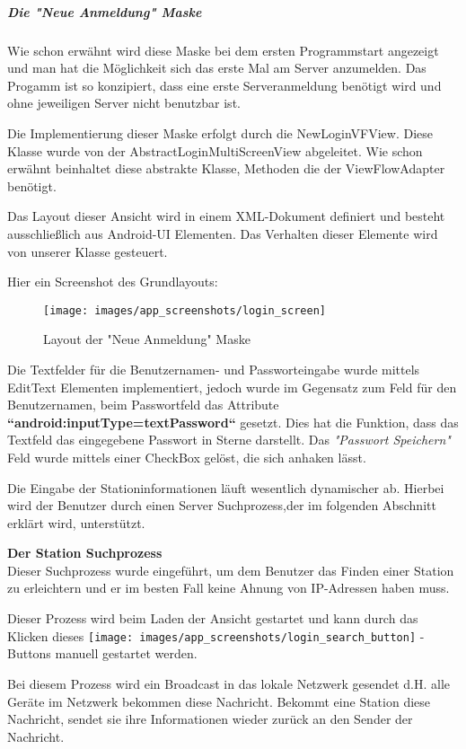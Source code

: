 \subparagraph{Die "Neue Anmeldung" Maske}
Wie schon erwähnt wird diese Maske bei dem ersten Programmstart angezeigt und man hat die Möglichkeit sich das erste Mal am Server anzumelden. Das Progamm ist so konzipiert, dass eine erste Serveranmeldung benötigt wird und ohne jeweiligen Server nicht benutzbar ist.

Die Implementierung dieser Maske erfolgt durch die NewLoginVFView. Diese Klasse wurde von der AbstractLoginMultiScreenView abgeleitet. Wie schon erwähnt beinhaltet diese abstrakte Klasse, Methoden die der ViewFlowAdapter benötigt. 

Das Layout dieser Ansicht wird in einem XML-Dokument definiert und besteht ausschließlich aus Android-UI Elementen. Das Verhalten dieser Elemente wird von unserer Klasse gesteuert.

Hier ein Screenshot des Grundlayouts:

\begin{figure}[H]
\centering
\texttt{[image: images/app\_screenshots/login\_screen]}
\caption{Layout der "Neue Anmeldung" Maske}
\end{figure}



Die Textfelder für die Benutzernamen- und Passworteingabe  wurde mittels EditText Elementen implementiert, jedoch wurde im Gegensatz zum Feld für den Benutzernamen,  beim Passwortfeld das Attribute \textbf{“android:inputType=textPassword“} gesetzt. Dies hat die Funktion, dass das Textfeld das eingegebene Passwort in Sterne darstellt. Das \textit{"Passwort Speichern"} Feld wurde mittels einer CheckBox gelöst, die sich anhaken lässt.

Die Eingabe der Stationinformationen läuft wesentlich dynamischer ab. Hierbei wird der Benutzer durch einen Server Suchprozess,der im folgenden Abschnitt erklärt wird, unterstützt.

\textbf{Der Station Suchprozess}\\
Dieser Suchprozess wurde eingeführt, um dem Benutzer das Finden einer Station zu erleichtern und er im besten Fall keine Ahnung von IP-Adressen haben muss.

Dieser Prozess wird beim Laden der Ansicht gestartet und kann durch das Klicken dieses \texttt{[image: images/app\_screenshots/login\_search\_button]} - Buttons manuell gestartet werden.

Bei diesem Prozess wird ein Broadcast in das lokale Netzwerk gesendet d.H. alle Geräte im Netzwerk bekommen diese Nachricht. Bekommt eine Station diese Nachricht, sendet sie ihre Informationen wieder zurück an den Sender der Nachricht.

